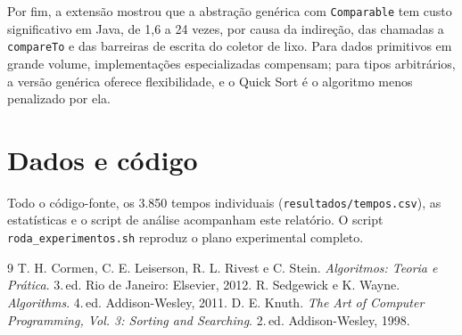 \documentclass[11pt,a4paper]{article}
\begin{document}
Por fim, a extensão mostrou que a abstração genérica com \texttt{Comparable} tem custo
significativo em Java, de 1,6 a 24 vezes, por causa da indireção, das chamadas a
\texttt{compareTo} e das barreiras de escrita do coletor de lixo. Para dados primitivos em grande
volume, implementações especializadas compensam; para tipos arbitrários, a versão genérica oferece
flexibilidade, e o Quick Sort é o algoritmo menos penalizado por ela.

\section*{Dados e código}
Todo o código-fonte, os 3.850 tempos individuais (\texttt{resultados/tempos.csv}), as estatísticas
e o script de análise acompanham este relatório. O script \texttt{roda\_experimentos.sh} reproduz o
plano experimental completo.

\begin{thebibliography}{9}
 T. H. Cormen, C. E. Leiserson, R. L. Rivest e C. Stein. \emph{Algoritmos: Teoria e
Prática}. 3.\,ed. Rio de Janeiro: Elsevier, 2012.
 R. Sedgewick e K. Wayne. \emph{Algorithms}. 4.\,ed. Addison-Wesley, 2011.
 D. E. Knuth. \emph{The Art of Computer Programming, Vol. 3: Sorting and Searching}.
2.\,ed. Addison-Wesley, 1998.
\end{thebibliography}
\end{document}
